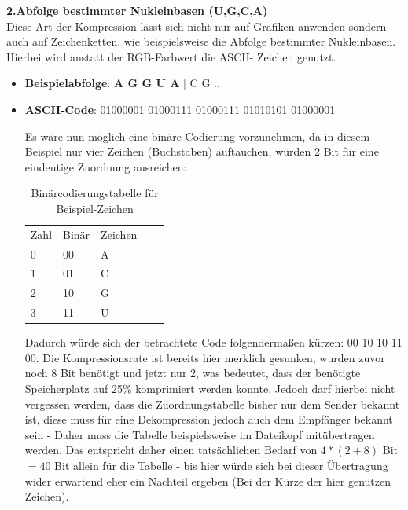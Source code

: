 \documentclass[11pt,a4paper,ngerman]{report}
\begin{document}
	
		
		
		\textbf{2.Abfolge bestimmter Nukleinbasen (U,G,C,A)} 
		\cite{Juchim2021}
		\\
		Diese Art der Kompression lässt sich nicht nur auf Grafiken anwenden sondern auch auf Zeichenketten, wie beispielsweise die Abfolge bestimmter Nukleinbasen. Hierbei wird anstatt der RGB-Farbwert die ASCII- Zeichen genutzt.
		
		\begin{itemize}
			\item \textbf{Beispielabfolge}: 
		   	 \textbf{A G G U A} | C G  ..
			
			\item \textbf{ASCII-Code}:
			01000001 01000111 01000111 01010101 01000001 
			
			\subitem Es wäre nun möglich eine binäre Codierung vorzunehmen, da in diesem Beispiel nur vier Zeichen (Buchstaben) auftauchen, würden 2 Bit für eine eindeutige Zuordnung ausreichen: 
			
			\begin{table} [H]
				\begin{center}
				\centering
				\begin{tabular}{lllll}
					Zahl  & Binär & Zeichen &  &  \\
					0 & 00    & A       &  &  \\
					1 & 01    & C       &  &  \\
					2 & 10    & G       &  & \\
					3 & 11	  & U
				
				\end{tabular}
			\label{Binärcode}		
			\caption{Binärcodierungstabelle für Beispiel-Zeichen}
			\end{center}
			\end{table}
			
			
		
			\subitem Dadurch würde sich der betrachtete Code folgendermaßen kürzen: 00 10 10 11 00. Die Kompressionsrate ist bereits hier merklich gesunken, wurden zuvor noch 8 Bit benötigt und jetzt nur 2, was bedeutet, dass der benötigte Speicherplatz auf 25\% komprimiert werden konnte. Jedoch darf hierbei nicht vergessen werden, dass die Zuordnungstabelle bisher nur dem Sender bekannt ist, diese muss für eine Dekompression jedoch auch dem Empfänger bekannt sein - Daher muss die Tabelle beispielsweise im  Dateikopf mitübertragen werden. Das entspricht daher einen tatsächlichen Bedarf von $4 * (2 +8)$ Bit $= 40$ Bit allein für die Tabelle - bis hier würde sich bei dieser Übertragung wider erwartend eher ein Nachteil ergeben (Bei der Kürze der hier genutzen Zeichen).
			

\end{itemize}
\end{document}
